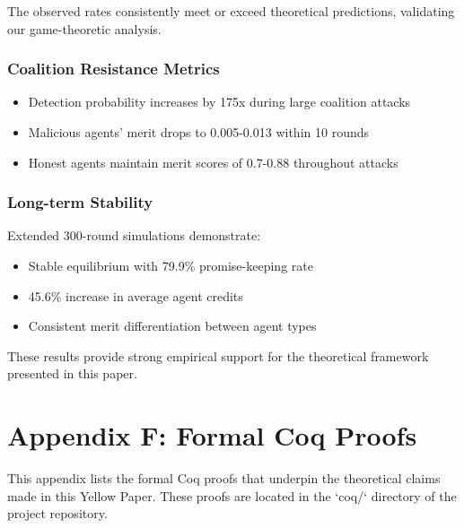\documentclass[11pt]{article}
\begin{document}
The observed rates consistently meet or exceed theoretical predictions, validating our game-theoretic analysis.
\subsubsection{Coalition Resistance Metrics}
\label{sec:orgb85d5d1}
\begin{itemize}
\item Detection probability increases by 175x during large coalition attacks
\item Malicious agents' merit drops to 0.005-0.013 within 10 rounds
\item Honest agents maintain merit scores of 0.7-0.88 throughout attacks
\end{itemize}
\subsubsection{Long-term Stability}
\label{sec:orga2fda47}
Extended 300-round simulations demonstrate:
\begin{itemize}
\item Stable equilibrium with 79.9\% promise-keeping rate
\item 45.6\% increase in average agent credits
\item Consistent merit differentiation between agent types
\end{itemize}

These results provide strong empirical support for the theoretical framework presented in this paper.
\section{Appendix F: Formal Coq Proofs}
\label{sec:org330cded}
This appendix lists the formal Coq proofs that underpin the theoretical claims made in this Yellow Paper. These proofs are located in the `coq/` directory of the project repository.
\end{document}
